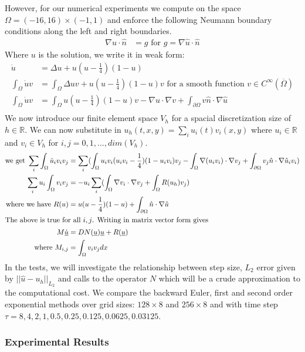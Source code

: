 However, for our numerical experiments we compute on the space $\Omega=(-16,16)\times(-1,1)$ and enforce the following Neumann boundary conditions along the left and right boundaries.
\begin{align*}
    \nabla u \cdot \hat n &= g \text{ for $g = \nabla \hat u \cdot \hat n$}
\end{align*}
Where $u$ is the solution, we write it in weak form:
\begin{align*}
    \dot u&=\Delta u+u(u-\frac14)(1-u)\\
    \int_{\Omega} \dot u v &=\int_{\Omega} \Delta uv+u(u-\frac14)(1-u)v \text{ for a smooth function $v \in C^{\infty}(\overline{\Omega})$}\\
    \int_{\Omega} \dot u v &=\int_{\Omega} u(u-\frac14)(1-u)v - \nabla u \cdot \nabla v + \int_{\partial\Omega}  v\hat n \cdot \nabla \hat u\\
\end{align*}
We now introduce our finite element space $V_h$ for a spacial discretization size of $h \in \mathbb{R}$.
We can now substitute in $u_h(t,x,y) = \sum_i u_i(t) v_i(x,y)$ where $u_i \in \mathbb{R}$ and $v_i \in V_h$ for $i,j = 0,1,...,dim(V_h)$.
\begin{align*}
    \text{we get } \sum_i\int_{\Omega} \dot u_i v_i v_j &=\sum_i(\int_{\Omega} u_iv_i(u_iv_i-\frac14)(1-u_iv_i)v_j - \int_{\Omega}\nabla (u_iv_i) \cdot \nabla v_j + \int_{\partial\Omega}  v_j\hat n \cdot \nabla \hat u_iv_i)\\
    \sum_iu_i\int_{\Omega}v_iv_j &= -u_i\sum_i(\int_{\Omega}\nabla v_i \cdot \nabla v_j + \int_{\Omega}R(u_h)v_j)\\
    \text{where we have } R(u)&=u(u-\frac14)(1-u) + \int_{\partial\Omega}  \hat n \cdot \nabla \hat  u\\
    \intertext{The above is true for all $i,j$. Writing in matrix vector form gives}
    M \underline{\dot u} &= DN(\underline{u})\underline{u} + R(\underline{u})\\
    \text{where } M_{i,j} &= \int_{\Omega}v_iv_jdx
\end{align*}
In the tests, we will investigate the relationship between step size, $L_2$ error given by $||\hat u - u_h||_{L_2}$ and calls to the operator $N$ which will be a crude approximation to the computational cost.
We compare the backward Euler, first and second order exponential methods over grid sizes: $128 \times 8$ and $256 \times 8$ and with time step $\tau=8,4,2,1,0.5,0.25,0.125,0.0625,0.03125$.

\subsubsection{Experimental Results}

